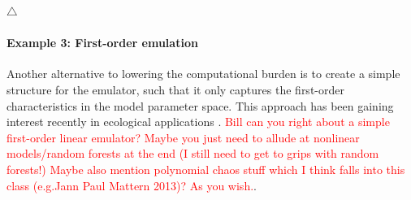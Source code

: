 \documentclass[10pt,a4paper]{article}
\newcommand\xqed[1]{%
  \leavevmode\unskip\penalty9999 \hbox{}\nobreak\hfill
  \quad\hbox{#1}}
\newcommand\demo{\xqed{$\triangle$}}
\newcommand{\red}{\textcolor{red}}
\begin{document}
\demo

\paragraph{Example 3: First-order emulation} Another alternative to lowering the computational burden is to create a simple structure for the emulator, such that it only captures the first-order characteristics in the model parameter space. This approach has been gaining interest recently in ecological applications \citep{Hooten_2011,Leeds_2013}. \red{Bill can you right about a simple first-order linear emulator? Maybe you just need to allude at nonlinear models/random forests at the end (I still need to get to grips with random forests!) Maybe also mention polynomial chaos stuff which I think falls into this class (e.g.Jann Paul Mattern 2013)? As you wish.}. 
\end{document}
